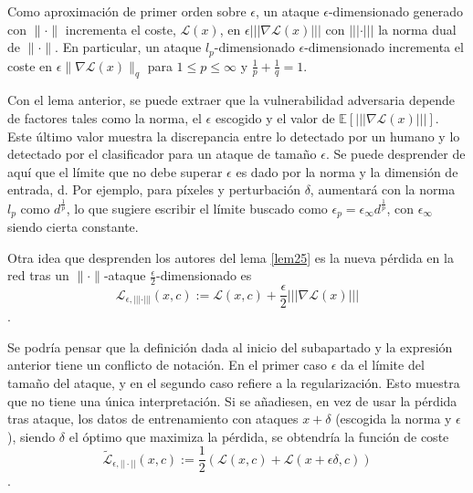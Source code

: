 

\begin{lema} \label{lem25}
Como aproximación de primer orden sobre \(\epsilon\), un ataque \(\epsilon\)-dimensionado generado con \(\|\cdot\|\) incrementa el coste, \(\mathcal{L}(x)\), en \(\epsilon |||\nabla \mathcal{L}(x)|||\) con \(|||\cdot|||\) la norma dual de \(\|\cdot\|\). En particular, un ataque \( l_p\)-dimensionado \(\epsilon\)-dimensionado incrementa el coste en \(\epsilon \|\nabla \mathcal{L}(x)\|_q\) para \(1 \leq p \leq \infty\) y \(\frac{1}{p} + \frac{1}{q} = 1\).

\end{lema}

Con el lema anterior, se puede extraer que la vulnerabilidad adversaria depende de factores tales como la norma, el $\epsilon$ escogido y el valor de $\mathbb{E}[|||\nabla \mathcal{L}(x)|||]$. Este último valor muestra la discrepancia entre lo detectado por un humano y lo detectado por el clasificador para un ataque de tamaño $\epsilon$. Se puede desprender de aquí que el límite que no debe superar $\epsilon$ es dado por la norma y la dimensión de entrada, d. Por ejemplo, para píxeles y perturbación $\delta$, aumentará con la norma $l_p$ como $d^{\frac{1}{p}}$, lo que sugiere escribir el límite buscado como $\epsilon_p = \epsilon_{\infty}d^{\frac{1}{p}}$, con $\epsilon_{\infty}$ siendo cierta constante.

Otra idea que desprenden los autores del lema \ref{lem25} es la nueva pérdida en la red tras un $\| \cdot \|$-ataque $\frac{\epsilon}{2}$-dimensionado es
$$\mathcal{L}_{\epsilon,|||\cdot|||}(x,c) := \mathcal{L}(x,c)+\frac{\epsilon}{2}|||\nabla \mathcal{L}(x)|||$$.

Se podría pensar que la definición dada al inicio del subapartado y la expresión anterior tiene un conflicto de notación. En el primer caso $\epsilon$ da el límite del tamaño del ataque, y en el segundo caso refiere a la regularización. Esto muestra que no tiene una única interpretación. Si se añadiesen, en vez de usar la pérdida tras ataque, los datos de entrenamiento con ataques $x+\delta$ (escogida la norma y $\epsilon$), siendo $\delta$ el óptimo que maximiza la pérdida, se obtendría la función de coste
$$\tilde{\mathcal{L}}_{\epsilon,||\cdot||}(x,c):=\frac{1}{2}(\mathcal{L}(x,c)+\mathcal{L}(x+\epsilon \delta,c))$$.

